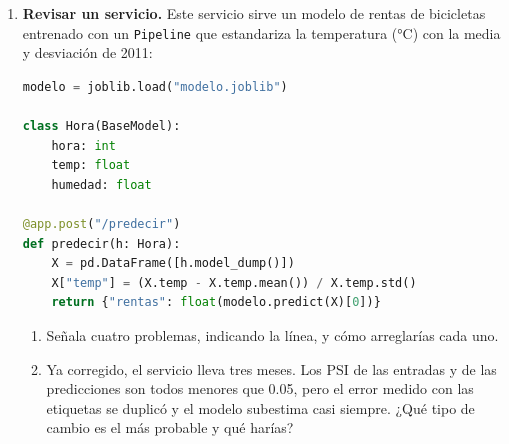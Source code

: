 \documentclass[11pt]{article}
\newcommand{\espacio}[1]{\par\vspace{#1}}
\newcommand{\nuevapagina}{\newpage}
\begin{document}
\begin{enumerate}
\begin{enumerate}
  \item Tu compañera te ofrece también un modelo que descargó de un foro, en un \texttt{.pkl}. ¿Por qué no deberías cargarlo con \texttt{pickle.load}, aunque no pienses usar sus predicciones?
  \espacio{2cm}
\end{enumerate}

\nuevapagina
\item \textbf{Revisar un servicio.} Este servicio sirve un modelo de rentas de bicicletas entrenado con un \texttt{Pipeline} que estandariza la temperatura (°C) con la media y desviación de 2011:
\begin{lstlisting}[language=Python]
modelo = joblib.load("modelo.joblib")

class Hora(BaseModel):
    hora: int
    temp: float
    humedad: float

@app.post("/predecir")
def predecir(h: Hora):
    X = pd.DataFrame([h.model_dump()])
    X["temp"] = (X.temp - X.temp.mean()) / X.temp.std()
    return {"rentas": float(modelo.predict(X)[0])}
\end{lstlisting}
\begin{enumerate}
  \item Señala cuatro problemas, indicando la línea, y cómo arreglarías cada uno.
  \espacio{4cm}

  \item Ya corregido, el servicio lleva tres meses. Los PSI de las entradas y de las predicciones son todos menores que 0.05, pero el error medido con las etiquetas se duplicó y el modelo subestima casi siempre. ¿Qué tipo de cambio es el más probable y qué harías?
  \espacio{2.5cm}
\end{enumerate}

\end{enumerate}
\end{document}
